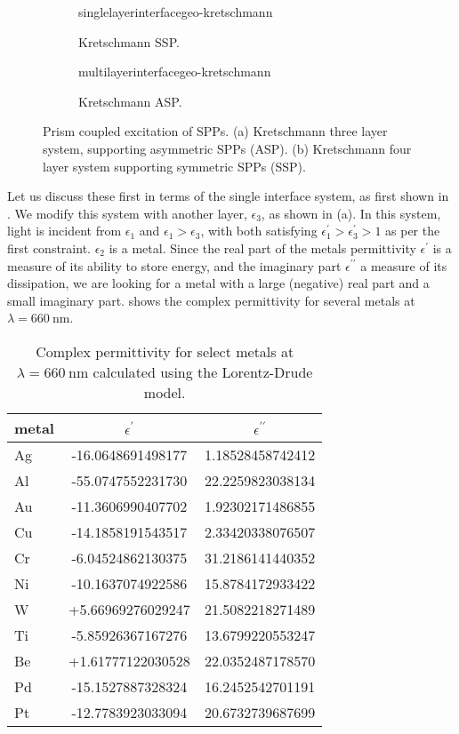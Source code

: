 \begin{figure}[ht]
 \centering
 \begin{subfigure}[b]{0.4\textwidth}
  \centering
  {singlelayerinterfacegeo-kretschmann}
  \caption{Kretschmann SSP.}
 \end{subfigure}
 \begin{subfigure}[b]{0.4\textwidth}
  \centering
  {multilayerinterfacegeo-kretschmann}
  \caption{Kretschmann ASP.}
 \end{subfigure}
\caption{Prism coupled excitation of SPPs.  (a) Kretschmann three layer
system, supporting asymmetric SPPs (ASP).  (b) Kretschmann
four layer system supporting symmetric SPPs (SSP). }
\label{fig:prismcoupledsetups}
\end{figure}
Let us discuss these first in terms of the single interface system, as
first shown in .  We modify this system with
another layer, $\epsilon_3$, as shown in
(a).  In this system, light is incident from
$\epsilon_1$ and $\epsilon_1>\epsilon_3$, with both satisfying
$\epsilon^\prime_1>\epsilon^\prime_3>1$ as per the first constraint.
$\epsilon_2$ is a metal.  Since the real part of the metals permittivity
$\epsilon^\prime$ is a measure of its ability to store energy, and the
imaginary part $\epsilon^{\prime\prime}$ a measure of its dissipation, we
are looking for a metal with a large (negative) real part and a small
imaginary part.   shows the complex permittivity for
several metals at $\lambda=\SI{660}{\nano\meter}$.

\begin{table}[ht]
\centering
{}
\begin{tabular}{lSS}
\toprule
metal & {$\epsilon^\prime$} & {$\epsilon^{\prime\prime}$} \\
\midrule
Ag & -16.0648691498177 & 1.18528458742412\\
Al & -55.0747552231730 & 22.2259823038134\\
Au & -11.3606990407702 & 1.92302171486855\\
Cu & -14.1858191543517 & 2.33420338076507\\
Cr & -6.04524862130375 & 31.2186141440352\\
Ni & -10.1637074922586 & 15.8784172933422\\
W  & +5.66969276029247 & 21.5082218271489\\
Ti & -5.85926367167276 & 13.6799220553247\\
Be & +1.61777122030528 & 22.0352487178570\\
Pd & -15.1527887328324 & 16.2452542701191\\
Pt & -12.7783923033094 & 20.6732739687699\\
\bottomrule
\end{tabular}
\caption{Complex permittivity for select metals at
$\lambda=\SI{660}{\nano\meter}$ calculated using the Lorentz-Drude model.}
\label{tbl:epsmetal600}
\end{table}

